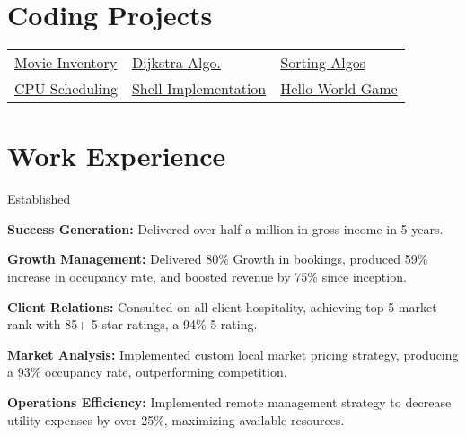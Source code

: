 \documentclass[]{deedy-resume-openfont}
\begin{document}
\begin{minipage}[t]{0.64\textwidth}
\section{Coding Projects}
\begin{tabularx}{1\textwidth} { 
   >{\raggedright\arraybackslash}X 
   >{\raggedright\arraybackslash}X 
   >{\raggedright\arraybackslash}X }

 \href{https://github.com/MarkWMavis/CSS_343_DataStructures_II/tree/main/04_InventorySystem}{Movie Inventory} & 
 \href{https://github.com/MarkWMavis/CSS_343_DataStructures_II/tree/main/03_DijkstraShortestPath}{Dijkstra Algo.} & 
 \href{https://github.com/MarkWMavis/CSS_342_DataStructures_I/tree/main/04_MergeSort}{Sorting Algos} \\
 \href{https://github.com/MarkWMavis/CSS_430_OperatingSystems/tree/main/P3_Scheduling\%20Algorithms}{CPU Scheduling}  & 
 \href{https://github.com/MarkWMavis/CSS_430_OperatingSystems/tree/main/P1_2_Unix\%20Shell}{Shell Implementation} & 
 \href{https://markwmavis.github.io/CSS_385_HelloWorld/}{Hello World Game} \\
\end{tabularx}
\sectionsep



\section{Work Experience}
Established 
\begin{tightemize}
    \item \textbf{Success Generation: } Delivered over half a million in gross income in 5 years.
    \item \textbf{Growth Management: } Delivered 80\% Growth in bookings, produced 59\% increase in occupancy rate, and boosted revenue by 75\%  since inception.
    \item \textbf{Client Relations: } Consulted on all client hospitality, achieving top 5 market rank with 85+ 5-star ratings, a 94\% 5-rating. 
    \item \textbf{Market Analysis: } Implemented custom local market pricing strategy, producing a 93\% occupancy rate, outperforming competition.
    \item \textbf{Operations Efficiency: } Implemented remote management strategy to decrease utility expenses by over 25\%, maximizing available resources.
\end{tightemize}
\sectionsep



\end{minipage}
\end{document}
